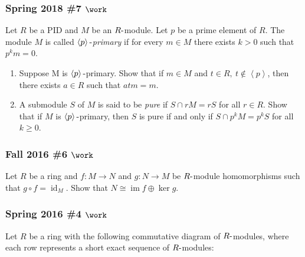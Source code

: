 \hypertarget{spring-2018-7-work}{%
\subsubsection{\texorpdfstring{Spring 2018 \#7
\(\work\)}{Spring 2018 \#7 \textbackslash work}}\label{spring-2018-7-work}}

Let \(R\) be a PID and \(M\) be an \(R{\hbox{-}}\)module. Let \(p\) be a
prime element of \(R\). The module \(M\) is called
\emph{\(\left\langle{p}\right\rangle{\hbox{-}}\)primary} if for every
\(m \in M\) there exists \(k > 0\) such that \(p^k m = 0\).

\begin{enumerate}
\def\labelenumi{\alph{enumi}.}
\item
  Suppose M is \(\left\langle{p}\right\rangle{\hbox{-}}\)primary. Show
  that if \(m \in M\) and
  \(t \in R, ~t \not\in \left\langle{p}\right\rangle\), then there
  exists \(a \in R\) such that \(atm = m\).
\item
  A submodule \(S\) of \(M\) is said to be \emph{pure} if
  \(S \cap r M = rS\) for all \(r \in R\). Show that if \(M\) is
  \(\left\langle{p}\right\rangle{\hbox{-}}\)primary, then \(S\) is pure
  if and only if \(S \cap p^k M = p^k S\) for all \(k \geq 0\).
\end{enumerate}

\hypertarget{fall-2016-6-work}{%
\subsubsection{\texorpdfstring{Fall 2016 \#6
\(\work\)}{Fall 2016 \#6 \textbackslash work}}\label{fall-2016-6-work}}

Let \(R\) be a ring and \(f: M\to N\) and \(g: N\to M\) be
\(R{\hbox{-}}\)module homomorphisms such that
\(g\circ f = \operatorname{id}_M\). Show that
\(N\cong \operatorname{im}f \oplus \ker g\).

\hypertarget{spring-2016-4-work}{%
\subsubsection{\texorpdfstring{Spring 2016 \#4
\(\work\)}{Spring 2016 \#4 \textbackslash work}}\label{spring-2016-4-work}}

Let \(R\) be a ring with the following commutative diagram of
\(R{\hbox{-}}\)modules, where each row represents a short exact sequence
of \(R{\hbox{-}}\)modules:

\begin{center}
\end{center}

